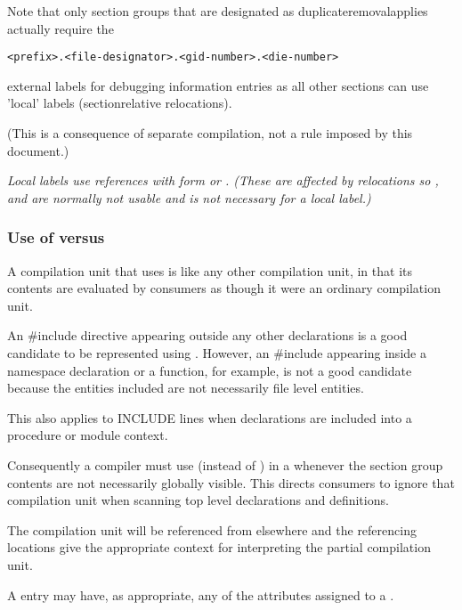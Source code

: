 Note that only 
section groups that are designated as
duplicate\dash removal\dash applies actually require the
\begin{alltt}
    <prefix>.<file-designator>.<gid-number>.<die-number>
\end{alltt}
external labels for debugging information entries as all other
 sections can use 'local' labels 
(section\dash relative
relocations).

(This is a consequence of separate compilation, not a rule
imposed by this document.)

\textit{Local labels use references with form \DWFORMreffour{}
or 
\DWFORMrefeight. 
(These are affected by relocations
so 
\DWFORMrefudata, 
\DWFORMrefone{} and 
\DWFORMreftwo{} are
normally not usable and 
\DWFORMrefaddr{} is not necessary
for a local label.)}


\subsubsection{Use of  versus 
}

A  compilation unit that uses 
\DWTAGcompileunit{}
is like any other compilation unit, in that its contents
are evaluated by consumers as though it were an ordinary
compilation unit.

An \#include directive appearing outside any other
declarations is a good candidate to be represented using
\DWTAGcompileunit. 
However, an \#include appearing inside
a  namespace declaration or a function, for example, is
not a good candidate because the entities included are not
necessarily file level entities.

This also applies to  INCLUDE lines when declarations
are included into a procedure or module context.

Consequently a compiler must use \DWTAGpartialunit{} (instead
of \DWTAGcompileunit) 
in a  
whenever the section group 
contents are not necessarily globally visible. 
This
directs consumers to ignore that compilation unit when scanning
top level declarations and definitions.

The \DWTAGpartialunit{} compilation unit will be referenced
from elsewhere and the referencing locations give the
appropriate context for interpreting the partial compilation
unit.

A \DWTAGpartialunit{} entry may have, as appropriate, any of
the attributes assigned to a \DWTAGcompileunit.


